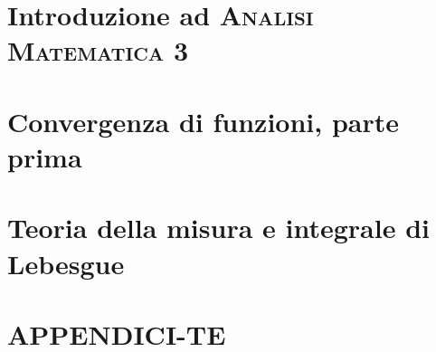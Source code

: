 \documentclass[a4paper, 11pt, twoside, openright, italian]{memoir}
\begin{document}
\frontmatter




\mainmatter

\part{Introduzione ad \textsc{Analisi Matematica 3}}

\part{Convergenza di funzioni, parte prima}



\part{Teoria della misura e integrale di Lebesgue}



%
%
%
%
%
%
%
\appendix
\part{APPENDICI-TE}


%

%
\backmatter

\end{document}
